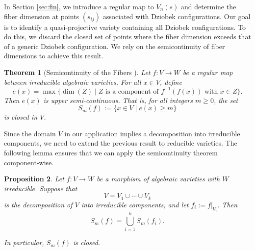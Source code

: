 \documentclass{amsart}
\newtheorem{theorem}{Theorem}[section]
\newtheorem{proposition}[theorem]{Proposition}
\theoremstyle{definition}
\theoremstyle{remark}
\numberwithin{equation}{section}
\begin{document}
In Section \ref{sec:fin}, we introduce a regular map to $V_n(s)$ and determine the fiber dimension at points $(s_{ij})$ associated with Dziobek configurations. Our goal is to identify a quasi-projective variety containing all Dziobek configurations. To do this, we discard the closed set of points where the fiber dimension exceeds that of a generic Dziobek configuration. We rely on the semicontinuity of fiber dimensions to achieve this result.

\begin{theorem}[Semicontinuity of the Fibers \cite{mumford2004red}]
\label{thm:semicontinuity}
Let $f \colon V \to W$ be a regular map between irreducible algebraic varieties. For all $x \in V$, define
\[
e(x) = \max \{ \dim(Z) \mid Z \text{ is a component of } f^{-1}(f(x)) \text{ with } x \in Z \}.
\]
Then $e(x)$ is upper semi-continuous. That is, for all integers $m \ge 0$, the set
\[
S_m(f) := \{ x \in V \mid e(x) \ge m \}
\]
is closed in $V$.
\end{theorem}

Since the domain $V$ in our application implies a decomposition into irreducible components, we need to extend the previous result to reducible varieties. The following lemma ensures that we can apply the semicontinuity theorem component-wise.

\begin{proposition}
\label{prop:reducible_semicontinuity}
Let $f \colon V \to W$ be a morphism of algebraic varieties with $W$ irreducible. Suppose that
\[
V = V_1 \cup \cdots \cup V_k
\]
is the decomposition of $V$ into irreducible components, and let $f_i := f|_{V_i}$. Then
\[
S_m(f) = \bigcup_{i=1}^k S_m(f_i).
\]

In particular, $S_m(f)$ is closed.
\end{proposition}
\end{document}
